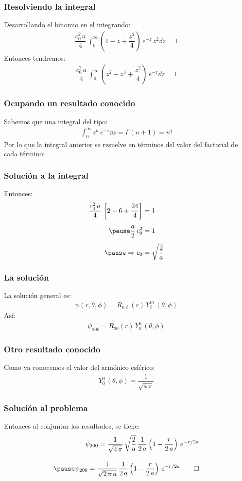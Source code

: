 \begin{frame}
\frametitle{Resolviendo la integral}
Desarrollando el binomio en el integrando:
\begin{align*}
\dfrac{c_{0}^{2} \, a}{4} \, \int_{0}^{\infty} \left( 1 - z + \dfrac{z^{2}}{4} \right) \, e^{-z} \, z^{2} \dd{z} = 1
\end{align*}
\pause
Entonces tendremos:
\begin{align*}
\dfrac{c_{0}^{2} \, a}{4} \, \int_{0}^{\infty} \left( z^{2} - z^{3} + \dfrac{z^{2}}{4} \right) \, e^{-z} \dd{z} = 1
\end{align*}
\end{frame}
\begin{frame}
\frametitle{Ocupando un resultado conocido}
Sabemos que una integral del tipo:
\begin{align*}
\int_{0}^{\infty} z^{n} \, e^{-z} \dd{z} = \Gamma(n + 1) = n!
\end{align*}
\pause
Por lo que la integral anterior se resuelve en términos del valor del factorial de cada término:
\end{frame}
\begin{frame}
\frametitle{Solución a la integral}
Entonces:
\begin{equation*}
\begin{aligned}
\dfrac{c_{0}^{2} \, a}{4} \, \left[ 2 - 6 + \dfrac{24}{4} \right]  &= 1 \\[0.5em] \pause
\dfrac{a}{2} \, c_{0}^{2} &= 1 \\[0.5em] \pause
\Rightarrow c_{0} &= \sqrt{\dfrac{2}{a}}
\end{aligned}
\end{equation*}
\end{frame}
\begin{frame}
\frametitle{La solución}
La solución general es:
\begin{align*}
\psi(r, \theta, \phi) = R_{n \ell} (r) \, Y_{\ell}^{m} \, (\theta, \phi)
\end{align*}
\pause
Así:
\begin{align*}
\psi_{200} = R_{2 0} (r) \, Y_{0}^{0} \, (\theta, \phi)
\end{align*}
\end{frame}
\begin{frame}
\frametitle{Otro resultado conocido}
Como ya conocemos el valor del armónico esférico:
\begin{align*}
Y_{0}^{0} \, (\theta, \phi) = \dfrac{1}{\sqrt{4 \, \pi}}
\end{align*}
\end{frame}
\begin{frame}
\frametitle{Solución al problema}
Entonces al conjuntar los resultados, se tiene:
\begin{equation*}
\begin{aligned}
\psi_{200} = \dfrac{1}{\sqrt{4 \, \pi}} \, \sqrt{\dfrac{2}{a}} \, \dfrac{1}{2 \, a} \left( 1 - \dfrac{r}{2 \, a} \right) \, e^{-r/2a} \\[1em] \pause
\psi_{200} = \dfrac{1}{\sqrt{2 \, \pi \, a}} \, \dfrac{1}{2 \, a} \left( 1 - \dfrac{r}{2 \, a} \right) \, e^{-r/2a} \qed
\end{aligned}
\end{equation*}
\end{frame}

